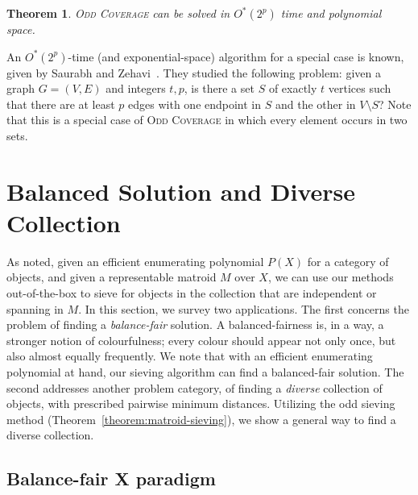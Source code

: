 \documentclass[10pt,a4paper]{article}
\newtheorem{theorem}{Theorem}[section]
\begin{document}
\begin{theorem}
  \textsc{Odd Coverage} can be solved in $O^*(2^p)$ time and polynomial space.
\end{theorem}

An $O^*(2^p)$-time (and exponential-space) algorithm for a special case is known, given by Saurabh and Zehavi~\cite{SaurabhZ18}.
They studied the following problem: given a graph $G = (V, E)$ and integers $t, p$, is there a set $S$ of exactly $t$ vertices such that there are at least $p$ edges with one endpoint in $S$ and the other in $V \setminus S$?
Note that this is a special case of \textsc{Odd Coverage} in which every element occurs in two sets.

\section{Balanced Solution and Diverse Collection}

As noted, given an efficient enumerating polynomial $P(X)$ for a
category of objects, and given a representable matroid $M$ over $X$,
we can use our methods out-of-the-box to sieve for objects in the
collection that are independent or spanning in $M$.
In this section, we survey two applications.
The first concerns the problem of finding a \emph{balance-fair} solution.
A balanced-fairness is, in a way, a stronger notion of colourfulness; every colour should appear not only once, but also almost equally frequently.
We note that with an efficient enumerating polynomial at hand, our sieving algorithm can find a balanced-fair solution. 
The second addresses another problem category, of finding a \emph{diverse}
collection of objects, with prescribed pairwise minimum distances.
Utilizing the odd sieving method (Theorem~\ref{theorem:matroid-sieving}), we show a general way to find a diverse collection.

\subsection{Balance-fair X paradigm}
\label{sec:balanced}
\end{document}
